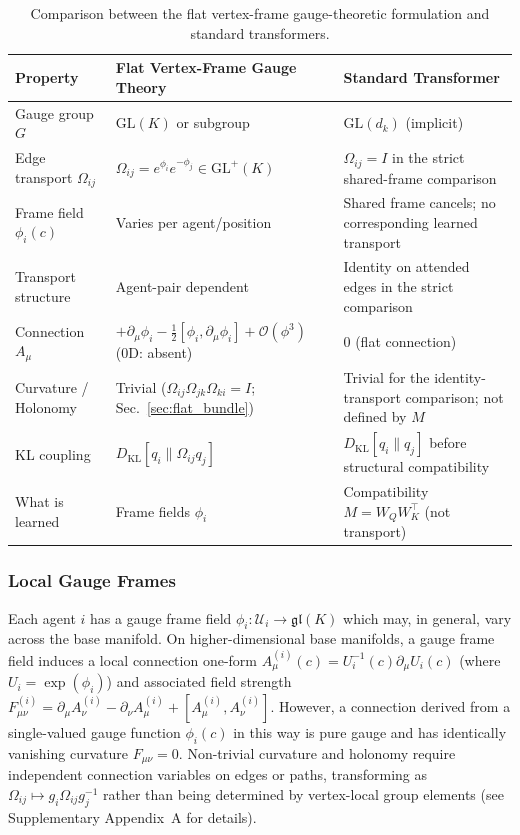 \documentclass[twoside,11pt]{article}
\begin{document}
\begin{table}[h]
\centering
\renewcommand{\arraystretch}{1.2}
\setlength{\tabcolsep}{6pt}
\begin{tabularx}{\textwidth}{lXX}
\hline
\textbf{Property} &
\textbf{Flat Vertex-Frame Gauge Theory} &
\textbf{Standard Transformer} \\
\hline
Gauge group $G$ &
$\mathrm{GL}(K)$ or subgroup &
$\mathrm{GL}(d_k)$ (implicit) \\
Edge transport $\Omega_{ij}$ &
$\Omega_{ij} = e^{\phi_i} e^{-\phi_j} \in \mathrm{GL}^+(K)$ &
$\Omega_{ij} = I$ in the strict shared-frame comparison \\
Frame field $\phi_i(c)$ &
Varies per agent/position &
Shared frame cancels; no corresponding learned transport \\
Transport structure &
Agent-pair dependent &
Identity on attended edges in the strict comparison \\
Connection $A_\mu$ &
$+\partial_\mu \phi_i - \tfrac{1}{2}[\phi_i, \partial_\mu \phi_i] + \mathcal{O}(\phi^3)$ (0D: absent) &
$0$ (flat connection) \\
Curvature / Holonomy &
Trivial ($\Omega_{ij}\Omega_{jk}\Omega_{ki} = I$; Sec.~\ref{sec:flat_bundle}) &
Trivial for the identity-transport comparison; not defined by $M$ \\
KL coupling &
$D_{\text{KL}}[q_i \| \Omega_{ij} q_j]$ &
$D_{\text{KL}}[q_i \| q_j]$ before structural compatibility \\
What is learned &
Frame fields $\phi_i$ &
Compatibility $M = W_QW_K^\top$ (not transport) \\
\hline
\end{tabularx}
\caption{Comparison between the flat vertex-frame gauge-theoretic formulation and standard transformers.}
\label{tab:gauge_vs_transformer}
\end{table}





\subsubsection{Local Gauge Frames}
Each agent $i$ has a gauge frame field $\phi_i: \mathcal{U}_i \to \mathfrak{gl}(K)$ which may, in general, vary across the base manifold. On higher-dimensional base manifolds, a gauge frame field induces a local connection one-form $A^{(i)}_\mu(c) = U_i^{-1}(c) \partial_\mu U_i(c)$ (where $U_i = \exp(\phi_i)$) and associated field strength $F^{(i)}_{\mu\nu} = \partial_\mu A^{(i)}_\nu - \partial_\nu A^{(i)}_\mu + [A^{(i)}_\mu, A^{(i)}_\nu]$. However, a connection derived from a single-valued gauge function $\phi_i(c)$ in this way is pure gauge and has identically vanishing curvature $F_{\mu\nu} = 0$. Non-trivial curvature and holonomy require independent connection variables on edges or paths, transforming as $\Omega_{ij} \mapsto g_i \Omega_{ij} g_j^{-1}$ rather than being determined by vertex-local group elements (see Supplementary Appendix~A for details).
\end{document}

